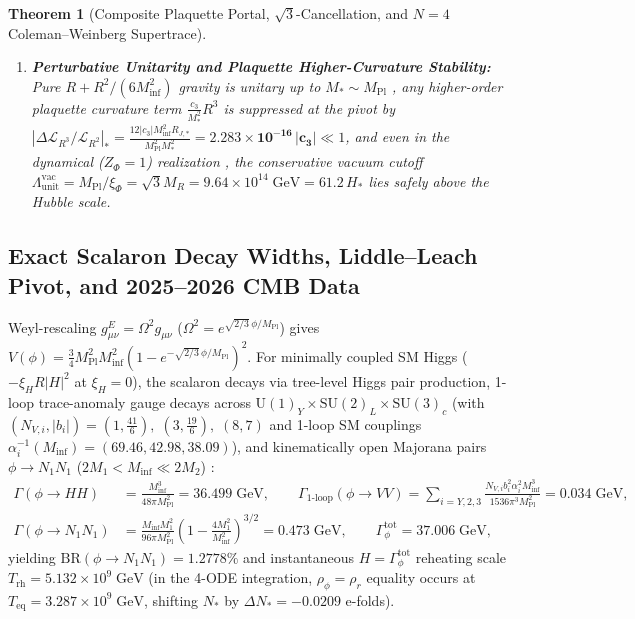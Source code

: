 \documentclass[11pt,a4paper]{article}
\newtheorem{theorem}{Theorem}[section]
\begin{document}
\begin{theorem}[Composite Plaquette Portal, \texorpdfstring{$\sqrt{3}$}{sqrt(3)}-Cancellation, and \texorpdfstring{$N = 4$}{N = 4} Coleman--Weinberg Supertrace]
\begin{enumerate}[label=(\alph*),leftmargin=1.8em,itemsep=3pt]
\item \textbf{Perturbative Unitarity and Plaquette Higher-Curvature Stability:} Pure $R + R^2/(6M_{\mathrm{inf}}^2)$ gravity is unitary up to $M_* \sim M_{\mathrm{Pl}}$ \cite{GorbunovTokareva2013}, any higher-order plaquette curvature term $\frac{c_3}{M_*^2}R^3$ is suppressed at the pivot by $|\Delta\mathcal{L}_{R^3}/\mathcal{L}_{R^2}|_* = \frac{12|c_3|M_{\mathrm{inf}}^2 R_{J,*}}{M_{\mathrm{Pl}}^2 M_*^2} = \mathbf{2.283\times 10^{-16}\,|c_3|} \ll 1$, and even in the dynamical ($Z_\Phi = 1$) realization \cite{BezrukovShaposhnikov2008}, the conservative vacuum cutoff $\Lambda_{\mathrm{unit}}^{\mathrm{vac}} = M_{\mathrm{Pl}}/\xi_\Phi = \sqrt{3}M_R = 9.64\times 10^{14}\;\mathrm{GeV} = 61.2\,H_*$ lies safely above the Hubble scale.
\end{enumerate}
\end{theorem}

\subsection{Exact Scalaron Decay Widths, Liddle--Leach Pivot, and 2025--2026 CMB Data}

Weyl-rescaling $g_{\mu\nu}^E = \Omega^2 g_{\mu\nu}$ ($\Omega^2 = e^{\sqrt{2/3}\,\phi/M_{\mathrm{Pl}}}$) gives $V(\phi) = \frac{3}{4}M_{\mathrm{Pl}}^2 M_{\mathrm{inf}}^2(1 - e^{-\sqrt{2/3}\,\phi/M_{\mathrm{Pl}}})^2$. For minimally coupled SM Higgs ($-\xi_H R|H|^2$ at $\xi_H = 0$), the scalaron decays via tree-level Higgs pair production, 1-loop trace-anomaly gauge decays across $\mathrm{U}(1)_Y \times \mathrm{SU}(2)_L \times \mathrm{SU}(3)_c$ \cite{Watanabe2011} (with $(N_{V,i}, |b_i|) = (1, \frac{41}{6}),\;(3, \frac{19}{6}),\;(8, 7)$ and 1-loop SM couplings $\alpha_i^{-1}(M_{\mathrm{inf}}) = (69.46, 42.98, 38.09)$), and kinematically open Majorana pairs $\phi \to N_1 N_1$ ($2M_1 < M_{\mathrm{inf}} \ll 2M_2$) \cite{GorbunovPanin2011}:
\begin{align}
\Gamma(\phi \to HH) &= \frac{M_{\mathrm{inf}}^3}{48\pi M_{\mathrm{Pl}}^2} = 36.499\;\mathrm{GeV}, \qquad
\Gamma_{\mathrm{1\text{-}loop}}(\phi \to VV) = \sum_{i=Y,2,3}\frac{N_{V,i} b_i^2 \alpha_i^2 M_{\mathrm{inf}}^3}{1536\pi^3 M_{\mathrm{Pl}}^2} = 0.034\;\mathrm{GeV}, \nonumber\\
\Gamma(\phi \to N_1 N_1) &= \frac{M_{\mathrm{inf}} M_1^2}{96\pi M_{\mathrm{Pl}}^2}\left(1 - \frac{4M_1^2}{M_{\mathrm{inf}}^2}\right)^{3/2} = 0.473\;\mathrm{GeV}, \qquad
\Gamma_\phi^{\mathrm{tot}} = 37.006\;\mathrm{GeV},
\label{eq:scalaron-widths}
\end{align}
yielding $\mathrm{BR}(\phi \to N_1 N_1) = \mathbf{1.2778\%}$ and instantaneous $H = \Gamma_\phi^{\mathrm{tot}}$ reheating scale $T_{\mathrm{rh}} = 5.132\times 10^9\;\mathrm{GeV}$ (in the 4-ODE integration, $\rho_\phi = \rho_r$ equality occurs at $T_{\mathrm{eq}} = 3.287\times 10^9\;\mathrm{GeV}$, shifting $N_*$ by $\Delta N_* = -0.0209$ e-folds).
\end{document}

